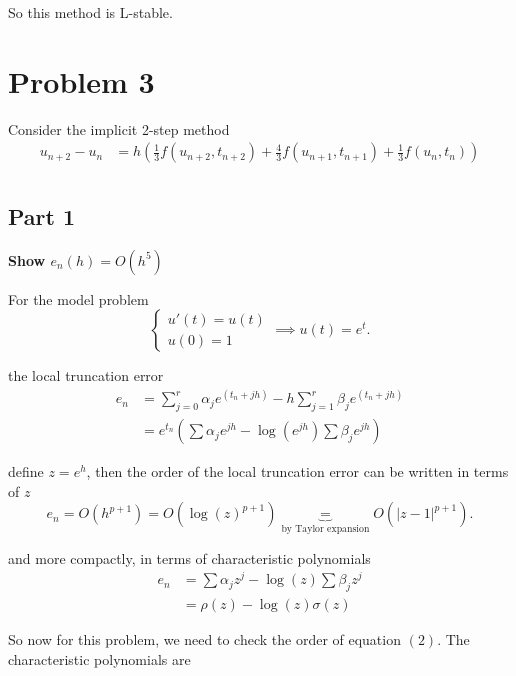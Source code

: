 \documentclass{article}
\begin{document}
So this method is L-stable.

\section{Problem 3}%
\label{sec:problem_3}

\par Consider the implicit 2-step method
\begin{align*}
  u_{n+2} - u_{n} &= h \left(\frac{1}{3}f(u_{n+2},t_{n+2})
  + \frac{4}{3}f(u_{n+1},t_{n+1}) + \frac{1}{3}f(u_{n},t_{n})\right) \\
\end{align*}

\subsection{Part 1}%
\label{sub:part_1}

\par \textbf{Show $e_n(h) = O(h^5)$}  

\par For the model problem 
\[
   \begin{cases}
     u'(t) = u(t) \\
     u(0) = 1
   \end{cases} \implies u(t) = e^{ t}
.\] 

\par the local truncation error 
\begin{align*}
  e_{n} &= \sum^{r}_{j=0} \alpha_{j}e^{ (t_{n}+jh)} - 
  h \sum^{r}_{j=1} \beta_{j}e^{ (t_{n}+jh)} \\
        &= e^{ t_{n}} \left( \sum \alpha_j e^{ jh} - \log(e^{jh})
        \sum \beta_j e^{ jh}\right)
\end{align*}

\par define $ z = e^{ h}$, then the order of the local truncation error
can be written in terms of $ z$
\[
  e_{n} = O(h^{p+1}) = O(\log( z)^{p+1}) \underbrace{=}_{\text{by Taylor
  expansion}} O( | z-1|^{p+1})
 .\] 


\par and more compactly, in terms of characteristic polynomials
 \begin{align}
   e_{n} &= \sum \alpha_j z^{j} - \log( z) \sum \beta_j z^{j} \\
         &= \rho( z) - \log( z) \sigma( z)
 \end{align}

 So now for this problem, we need to check the order of equation $(2)$. The
 characteristic polynomials are
\end{document}
